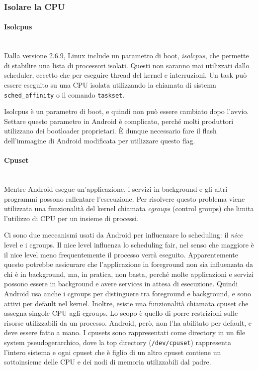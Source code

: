\subsubsection{Isolare la CPU}

\paragraph{Isolcpus} \mbox{} \\
Dalla versione 2.6.9, Linux include un parametro di boot, \textit{isolcpus}, che permette di stabilire una lista di processori isolati. Questi non saranno mai utilizzati dallo scheduler, eccetto che per eseguire thread del kernel e interruzioni. Un task può essere eseguito su una CPU isolata utilizzando la chiamata di sistema \texttt{sched\_affinity} o il comando \texttt{taskset}.

Isolcpus è un parametro di boot, e quindi non può essere cambiato dopo l'avvio. Settare questo parametro in Android è complicato, perché molti produttori utilizzano dei bootloader proprietari. È dunque necessario fare il flash dell'immagine di Android modificata per utilizzare questo flag.

\paragraph{Cpuset} \mbox{} \\
Mentre Android esegue un'applicazione, i servizi in background e gli altri programmi possono rallentare l'esecuzione. Per risolvere questo problema viene utilizzata una funzionalità del kernel chiamata \textit{cgroups} (control groups) che limita l'utilizzo di CPU per un insieme di processi.

Ci sono due meccanismi usati da Android per influenzare lo scheduling: il \textit{nice} level e i cgroups. Il nice level influenza lo scheduling fair, nel senso che maggiore è il nice level meno frequentemente il processo verrà eseguito. Apparentemente questo potrebbe assicurare che l'applicazione in foreground non sia influenzata da chi è in background, ma, in pratica, non basta, perché molte applicazioni e servizi possono essere in background e avere services in attesa di esecuzione. Quindi Android usa anche i cgroups per distinguere tra foreground e background, e sono attivi per default nel kernel. Inoltre, esiste una funzionalità chiamata cpuset che assegna singole CPU agli cgroups. Lo scopo è quello di porre restrizioni sulle risorse utilizzabili da un processo. Android, però, non l'ha abilitato per default, e deve essere fatto a mano. I cpusets sono rappresentati come directory in un file system pseudogerarchico, dove la top directory (\texttt{/dev/cpuset}) rappresenta l'intero sistema e ogni cpuset che è figlio di un altro cpuset contiene un sottoinsieme delle CPU e dei nodi di memoria utilizzabili dal padre. 

